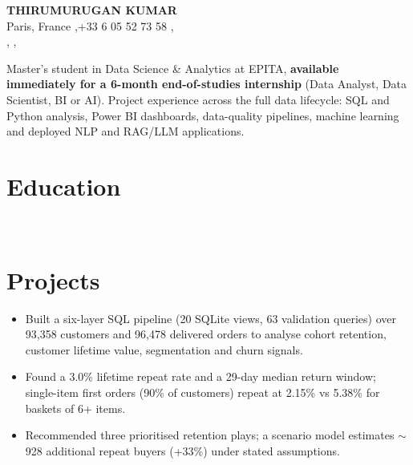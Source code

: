


\begin{center}
  {\LARGE\bfseries THIRUMURUGAN KUMAR}\\[3pt]
  Paris, France \sep +33 6 05 52 73 58 \sep {}\\[1pt]
   \sep
   \sep
\end{center}
\vspace{2pt}

Master's student in Data Science \& Analytics at EPITA, \textbf{available immediately for a 6-month end-of-studies internship} (Data Analyst, Data Scientist, BI or AI). Project experience across the full data lifecycle: SQL and Python analysis, Power BI dashboards, data-quality pipelines, machine learning and deployed NLP and RAG/LLM applications.

\section{Education}
\\

\section{Projects}
\begin{itemize}
  \item Built a six-layer SQL pipeline (20 SQLite views, 63 validation queries) over 93,358 customers and 96,478 delivered orders to analyse cohort retention, customer lifetime value, segmentation and churn signals.
  \item Found a 3.0\% lifetime repeat rate and a 29-day median return window; single-item first orders (90\% of customers) repeat at 2.15\% vs 5.38\% for baskets of 6+ items.
  \item Recommended three prioritised retention plays; a scenario model estimates $\sim$928 additional repeat buyers (+33\%) under stated assumptions.
\end{itemize}


